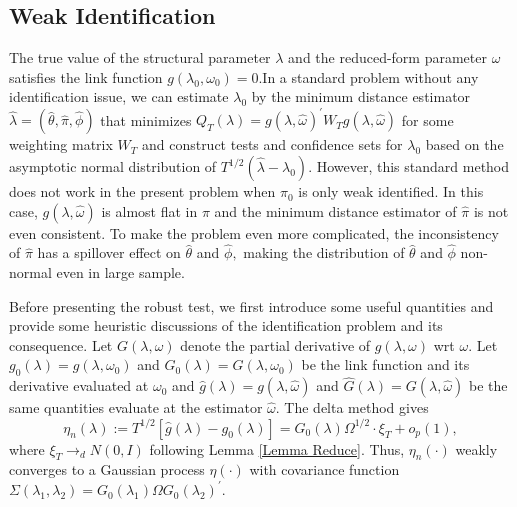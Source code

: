 \documentclass[11pt]{article}
\begin{document}
\subsection{Weak Identification}

The true value of the structural parameter $\lambda $ and the reduced-form
parameter $\omega $ satisfies the link function $g(\lambda _{0},\omega
_{0})=0.$In a standard problem without any identification issue, we can
estimate $\lambda _{0}$ by the minimum distance estimator $\widehat{\lambda }%
=(\widehat{\theta },\widehat{\pi },\widehat{\phi })$ that minimizes $%
Q_{T}(\lambda )=g(\lambda ,\widehat{\omega })^{\prime }W_{T}g(\lambda ,%
\widehat{\omega })$ for some weighting matrix $W_{T}$ and construct tests
and confidence sets for $\lambda _{0}$ based on the asymptotic normal
distribution of $T^{1/2}(\widehat{\lambda }-\lambda _{0})$. However, this
standard method does not work in the present problem when $\pi _{0}$ is only
weak identified. In this case, $g(\lambda ,\widehat{\omega })$ is almost
flat in $\pi $ and the minimum distance estimator of $\widehat{\pi }$ is not
even consistent. To make the problem even more complicated, the
inconsistency of $\widehat{\pi }$ has a spillover effect on $\widehat{\theta 
}$ and $\widehat{\phi },$ making the distribution of $\widehat{\theta }$ and 
$\widehat{\phi }$ non-normal even in large sample.

Before presenting the robust test, we first introduce some useful quantities
and provide some heuristic discussions of the identification problem and its
consequence. Let $G(\lambda ,\omega )$ denote the partial derivative of $%
g(\lambda ,\omega )$ wrt $\omega .$ Let $g_{0}(\lambda )=g(\lambda ,\omega
_{0})$ and $G_{0}(\lambda )=G(\lambda ,\omega _{0})$ be the link function
and its derivative evaluated at $\omega _{0}$ and $\widehat{g}(\lambda
)=g(\lambda ,\widehat{\omega })$ and $\widehat{G}(\lambda )=G(\lambda ,%
\widehat{\omega })$ be the same quantities evaluate at the estimator $%
\widehat{\omega }.$ The delta method gives 
\begin{equation}
\eta _{n}(\lambda ):=T^{1/2}\left[ \widehat{g}(\lambda )-g_{0}(\lambda )%
\right] =G_{0}(\lambda )\Omega ^{1/2}\cdot \xi _{T}+o_{p}(1),
\label{emp pro}
\end{equation}%
where $\xi _{T}\rightarrow _{d}N(0,I)$ following Lemma \ref{Lemma Reduce}.
Thus, $\eta _{n}(\cdot )$ weakly converges to a Gaussian process $\eta
(\cdot )$ with covariance function $\Sigma (\lambda _{1},\lambda
_{2})=G_{0}(\lambda _{1})\Omega G_{0}(\lambda _{2})^{\prime }.$
\end{document}
